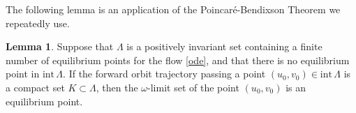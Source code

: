 \documentclass{amsart}
\theoremstyle{definition}
\newtheorem{lemma}[thm1]{Lemma}
\numberwithin{equation}{section}
\def\ii{{\textrm{int}}\,}
\begin{document}
The following lemma is an application of the Poincar\'e-Bendixson Theorem we repeatedly use.
\begin{lemma} \label{pb} Suppose that $\Lambda$ is a positively invariant set containing a finite number of equilibrium points for the flow \eqref{ode}, and that there is no equilibrium point in $\ii \Lambda$. If the forward orbit trajectory passing a point $(u_0,v_0) \in \ii \Lambda$ is a compact set $K \subset \Lambda$, then the $\omega$-limit set of the point $(u_0,v_0)$ is an equilibrium point.


\end{lemma}
\end{document}

